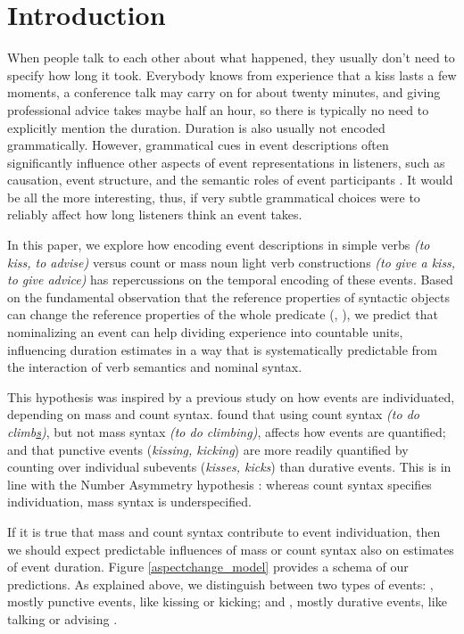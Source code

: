 \documentclass[review,12pt,authoryear]{elsarticle}
\newcommand*{\sectionformat}{\centering}
\begin{document}
\section*{\sectionformat Introduction}
When people talk to each other about what happened, they usually don't need to specify how long it took. Everybody knows from experience that a kiss lasts a few moments, a conference talk may carry on for about twenty minutes, and giving professional advice takes maybe half an hour, so there is typically no need to explicitly mention the duration. Duration is also usually not encoded grammatically. However, grammatical cues in event descriptions often significantly influence other aspects of event representations in listeners, such as causation, event structure, and the semantic roles of event participants \citep{fausey2010, wittenberg2014sorting,JohnsonGoldberg2013}. It would be all the more interesting, thus, if very subtle grammatical choices were to reliably affect how long listeners think an event takes. 

In this paper, we explore how encoding event descriptions in simple verbs \emph{(to kiss, to advise)} versus count or mass noun light verb constructions \emph{(to give a kiss, to give advice)} has repercussions on the temporal encoding of these events. Based on the fundamental observation that the reference properties of syntactic objects can change the reference properties of the whole predicate (\citeauthor{Krifka1992}, \citeyear{Krifka1992}), we predict that nominalizing an event can help dividing experience into countable units, influencing duration estimates in a way that is systematically predictable from the interaction of verb semantics and nominal syntax.

This hypothesis was inspired by a previous study on how events are individuated, depending on mass and count syntax. \citet{barner2008events} found that using count syntax \emph{(to do climb\underline{s})}, but not mass syntax \emph{(to do climbing)}, affects how events are quantified; and that punctive events (\emph{kissing, kicking}) are more readily quantified by counting over individual subevents (\emph{kisses, kicks}) than durative events. This is in line with the Number Asymmetry hypothesis \citep{Barner2006}: whereas count syntax specifies individuation, mass syntax is underspecified. 

If it is true that mass and count syntax contribute to event individuation, then we should expect predictable influences of mass or count syntax also on estimates of event duration. Figure \ref{aspectchange_model} provides a schema of our predictions. As explained above, we distinguish between two types of events: {}, mostly punctive events, like kissing or kicking; and {}, mostly durative events, like talking or advising \citep[ see Footnote \ref{aspectualdistinction}]{Dowty1991,Vendler1957}. 
\end{document}

